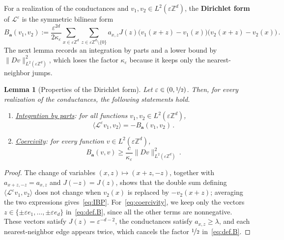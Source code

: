 \documentclass[11pt]{amsart}
\newtheorem{lemma}[theorem]{Lemma}
\numberwithin{equation}{section}
\newcommand{\Z}{\mathbb{Z}}
\newcommand{\ba}{\mathbf{a}}
\newcommand{\eps}{\varepsilon}
\newcommand{\Leps}{\mathcal{L}^\varepsilon}
\newcommand{\nf}{\nicefrac}
\begin{document}
For a realization of the conductances and $v_1, v_2 \in L^2(\eps \Z^d)$, the \textbf{Dirichlet form} of $\Leps$ is the symmetric bilinear form
\begin{equation} \label{eq:def.B}
    B_\ba(v_1, v_2) := \frac{\eps^{2d}}{2 \kappa_\eps} \sum_{x \in \eps \Z^d} \sum_{z \in \eps \Z^d \setminus \{0\}} a_{x,z} J(z) \bigl( v_1(x + z) - v_1(x) \bigr) \bigl( v_2(x + z) - v_2(x) \bigr)\,.
\end{equation}
The next lemma records an integration by parts and a lower bound by $\|D v\|_{L^2(\eps \Z^d)}^2$, which loses the factor $\kappa_\eps$ because it keeps only the nearest-neighbor jumps.

\begin{lemma}[Properties of the Dirichlet form] \label{lem:Dirichlet}
Let $\eps \in (0, \nf12)$.
Then, for every realization of the conductances, the following statements hold.
\begin{enumerate}
    \item[\textup{(i)}] \underline{\emph{Integration by parts}}: for all functions $v_1, v_2 \in L^2(\eps \Z^d)$,
    \begin{equation} \label{eq:IBP}
        \langle \Leps v_1, v_2 \rangle = - B_\ba(v_1, v_2)\,.
    \end{equation}
    \item[\textup{(ii)}] \underline{\emph{Coercivity}}: for every function $v \in L^2(\eps \Z^d)$,
    \begin{equation} \label{eq:coercivity}
        B_\ba(v, v) \geq \frac{c}{\kappa_\eps} \|D v\|_{L^2(\eps \Z^d)}^2\,.
    \end{equation}
\end{enumerate}
\end{lemma}

\begin{proof}
The change of variables $(x, z) \mapsto (x + z, -z)$, together with $a_{x + z, -z} = a_{x,z}$ and $J(-z) = J(z)$, shows that the double sum defining $\langle \Leps v_1, v_2 \rangle$ does not change when $v_2(x)$ is replaced by $-v_2(x+z)$; averaging the two expressions gives~\eqref{eq:IBP}.
For~\eqref{eq:coercivity}, we keep only the vectors $z \in \{\pm \eps e_1, \ldots, \pm \eps e_d\}$ in~\eqref{eq:def.B}, since all the other terms are nonnegative.
These vectors satisfy $J(z) = \eps^{-d-2}$, the conductances satisfy $a_{x,z} \geq \lambda$, and each nearest-neighbor edge appears twice, which cancels the factor $\nf12$ in~\eqref{eq:def.B}.
\end{proof}
\end{document}
